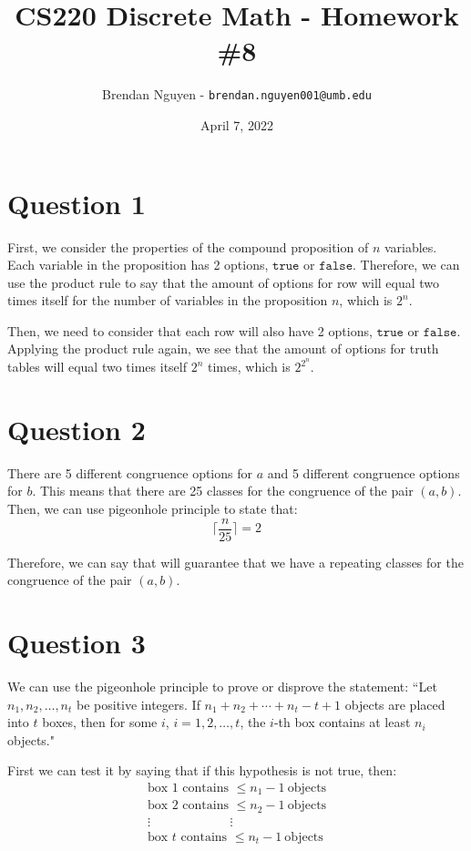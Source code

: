 \documentclass[letterpaper, 12pt]{article}
\title{CS220 Discrete Math - Homework \#8}
\author{Brendan Nguyen - \texttt{brendan.nguyen001@umb.edu}}
\date{April 7, 2022}
\begin{document}
\maketitle

\section*{Question 1}
First, we consider the properties of the compound proposition of $n$ variables. Each variable in the proposition has 2 options, $\texttt{true}$ or $\texttt{false}$. Therefore, we can use the product rule to say that the amount of options for row will equal two times itself for the number of variables in the proposition $n$, which is $2^n$.

Then, we need to consider that each row will also have 2 options, $\texttt{true}$ or $\texttt{false}$. Applying the product rule again, we see that the amount of options for truth tables will equal two times itself $2^n$ times, which is $2^{2^n}$.

\section*{Question 2}
There are 5 different congruence options for $a$ and 5 different congruence options for $b$. This means that there are 25 classes for the congruence of the pair $(a, b)$. Then, we can use pigeonhole principle to state that:
\[\Big\lceil\frac{n}{25}\Big\rceil = 2\]

Therefore, we can say that  will guarantee that we have a repeating classes for the congruence of the pair $(a, b)$.

\section*{Question 3}
We can use the pigeonhole principle to prove or disprove the statement: ``Let $n_1,n_2,\ldots,n_t$ be positive integers. If $n_1 + n_2 + \cdots + n_t - t + 1$ objects are placed into $t$ boxes, then for some $i$, $i = 1,2,\ldots,t$, the $i$-th box contains at least $n_i$ objects."

First we can test it by saying that if this hypothesis is not true, then:
\begin{gather*}
    \text{box 1 contains } \leq n_1 - 1\ \text{objects}\\
    \text{box 2 contains } \leq n_2 - 1\ \text{objects}\\
    \vdots\hspace{75pt}\vdots\\
    \text{box $t$ contains } \leq n_t - 1\ \text{objects}
\end{gather*}
\end{document}
